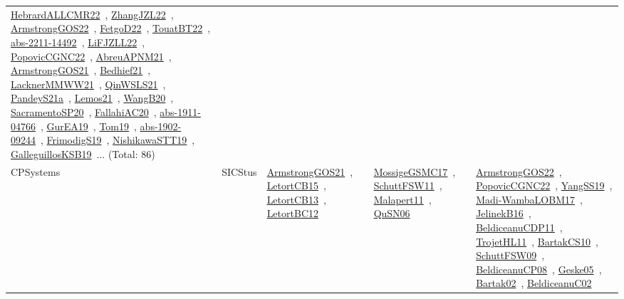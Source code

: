 {\begin{longtable}{lp{3cm}>{\raggedright\arraybackslash}p{6cm}>{\raggedright\arraybackslash}p{6cm}>{\raggedright\arraybackslash}p{8cm}}
\href{works/HebrardALLCMR22.pdf}{HebrardALLCMR22}~\cite{HebrardALLCMR22}, \href{works/ZhangJZL22.pdf}{ZhangJZL22}~\cite{ZhangJZL22}, \href{works/ArmstrongGOS22.pdf}{ArmstrongGOS22}~\cite{ArmstrongGOS22}, \href{works/FetgoD22.pdf}{FetgoD22}~\cite{FetgoD22}, \href{works/TouatBT22.pdf}{TouatBT22}~\cite{TouatBT22}, \href{works/abs-2211-14492.pdf}{abs-2211-14492}~\cite{abs-2211-14492}, \href{works/LiFJZLL22.pdf}{LiFJZLL22}~\cite{LiFJZLL22}, \href{works/PopovicCGNC22.pdf}{PopovicCGNC22}~\cite{PopovicCGNC22}, \href{works/AbreuAPNM21.pdf}{AbreuAPNM21}~\cite{AbreuAPNM21}, \href{works/ArmstrongGOS21.pdf}{ArmstrongGOS21}~\cite{ArmstrongGOS21}, \href{works/Bedhief21.pdf}{Bedhief21}~\cite{Bedhief21}, \href{works/LacknerMMWW21.pdf}{LacknerMMWW21}~\cite{LacknerMMWW21}, \href{works/QinWSLS21.pdf}{QinWSLS21}~\cite{QinWSLS21}, \href{works/PandeyS21a.pdf}{PandeyS21a}~\cite{PandeyS21a}, \href{works/Lemos21.pdf}{Lemos21}~\cite{Lemos21}, \href{works/WangB20.pdf}{WangB20}~\cite{WangB20}, \href{works/SacramentoSP20.pdf}{SacramentoSP20}~\cite{SacramentoSP20}, \href{works/FallahiAC20.pdf}{FallahiAC20}~\cite{FallahiAC20}, \href{works/abs-1911-04766.pdf}{abs-1911-04766}~\cite{abs-1911-04766}, \href{works/GurEA19.pdf}{GurEA19}~\cite{GurEA19}, \href{works/Tom19.pdf}{Tom19}~\cite{Tom19}, \href{works/abs-1902-09244.pdf}{abs-1902-09244}~\cite{abs-1902-09244}, \href{works/FrimodigS19.pdf}{FrimodigS19}~\cite{FrimodigS19}, \href{works/NishikawaSTT19.pdf}{NishikawaSTT19}~\cite{NishikawaSTT19}, \href{works/GalleguillosKSB19.pdf}{GalleguillosKSB19}~\cite{GalleguillosKSB19}... (Total: 86)\\
CPSystems & SICStus & \href{works/ArmstrongGOS21.pdf}{ArmstrongGOS21}~\cite{ArmstrongGOS21}, \href{works/LetortCB15.pdf}{LetortCB15}~\cite{LetortCB15}, \href{works/LetortCB13.pdf}{LetortCB13}~\cite{LetortCB13}, \href{works/LetortBC12.pdf}{LetortBC12}~\cite{LetortBC12} & \href{works/MossigeGSMC17.pdf}{MossigeGSMC17}~\cite{MossigeGSMC17}, \href{works/SchuttFSW11.pdf}{SchuttFSW11}~\cite{SchuttFSW11}, \href{works/Malapert11.pdf}{Malapert11}~\cite{Malapert11}, \href{works/QuSN06.pdf}{QuSN06}~\cite{QuSN06} & \href{works/ArmstrongGOS22.pdf}{ArmstrongGOS22}~\cite{ArmstrongGOS22}, \href{works/PopovicCGNC22.pdf}{PopovicCGNC22}~\cite{PopovicCGNC22}, \href{works/YangSS19.pdf}{YangSS19}~\cite{YangSS19}, \href{works/Madi-WambaLOBM17.pdf}{Madi-WambaLOBM17}~\cite{Madi-WambaLOBM17}, \href{works/JelinekB16.pdf}{JelinekB16}~\cite{JelinekB16}, \href{works/BeldiceanuCDP11.pdf}{BeldiceanuCDP11}~\cite{BeldiceanuCDP11}, \href{works/TrojetHL11.pdf}{TrojetHL11}~\cite{TrojetHL11}, \href{works/BartakCS10.pdf}{BartakCS10}~\cite{BartakCS10}, \href{works/SchuttFSW09.pdf}{SchuttFSW09}~\cite{SchuttFSW09}, \href{works/BeldiceanuCP08.pdf}{BeldiceanuCP08}~\cite{BeldiceanuCP08}, \href{works/Geske05.pdf}{Geske05}~\cite{Geske05}, \href{works/Bartak02.pdf}{Bartak02}~\cite{Bartak02}, \href{works/BeldiceanuC02.pdf}{BeldiceanuC02}~\cite{BeldiceanuC02}\\

\end{longtable}}
